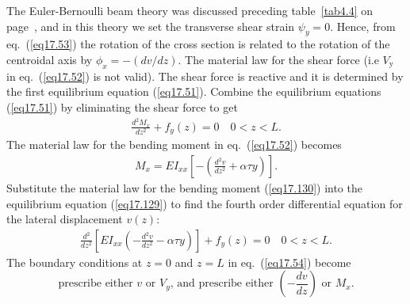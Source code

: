 \documentclass{AeroStructure-ERJohnson}
\begin{document}
The Euler-Bernoulli beam theory was discussed preceding table~\ref{tab4.4} on page~\pageref{tab4.4}, and in this theory we set the transverse shear strain $\psi_{y}=0$. Hence, from eq.~(\ref{eq17.53}) the rotation of the cross section is related to the rotation of the centroidal axis by $\phi_{x}=-(d v/d z)$. The material law for the shear force (i.e $V_{\textrm{y}}$ in eq.~(\ref{eq17.52}) is not valid). The shear force is reactive and it is determined by the first equilibrium equation (\ref{eq17.51}). Combine the equilibrium equations (\ref{eq17.51}) by eliminating the shear force to get
\begin{align}\label{eq17.129}
\frac{d^{2} M_{x}}{d z^{2}}+f_{y}(z)=0 \quad 0<z<L.
\end{align}
The material law for the bending moment in eq.~(\ref{eq17.52}) becomes
\begin{align}\label{eq17.130}
M_{x}=E I_{x x}\left[-\left(\frac{d^{2} v}{d z^{2}}+\alpha \tau y\right)\right].
\end{align}
Substitute the material law for the bending moment (\ref{eq17.130}) into the equilibrium equation (\ref{eq17.129}) to find the fourth order differential equation for the lateral displacement $v(z)$:
\begin{align}\label{eq17.131}
\frac{d^{2}}{d z^{2}}\left[E I_{x x}\left(-\frac{d^{2} v}{d z^{2}}-\alpha \tau y\right)\right]+f_{y}(z)=0 \quad 0<z<L.
\end{align}
The boundary conditions at $z=0$ and $z=L$ in eq.~(\ref{eq17.54}) become
\begin{equation}
\textrm{prescribe either $v$ or $V_{y}$, and prescribe either } \left(-\frac{d v}{d z}\right) \textrm{ or } M_{x}. \label{eq17.132}
\end{equation}
\end{document}
